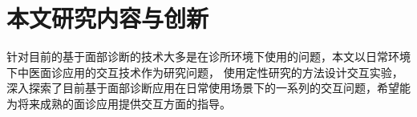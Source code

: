 
















\section{本文研究内容与创新}

针对目前的基于面部诊断的技术大多是在诊所环境下使用的问题，本文以日常环境下中医面诊应用的交互技术作为研究问题，
使用定性研究的方法设计交互实验，深入探索了目前基于面部诊断应用在日常使用场景下的一系列的交互问题，希望能为将来成熟的面诊应用提供交互方面的指导。

